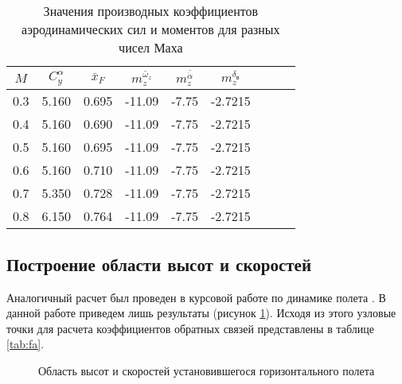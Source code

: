 \begin{table}[H]
\centering
\caption{Значения производных коэффициентов аэродинамических сил и моментов для разных чисел Маха}
\label{tab:aero_coeff}
\begin{tabular}{|c|c|c|c|c|c|c|c|c|}
\hline
$M$ & $C_y^\alpha$ & $\bar{x}_{F}$ & $m_z^{\bar{\omega}_z}$ & $m_{z}^{\bar{\dot{\alpha}}}$ & $m_z^{\delta_в}$ \\
\hline
0.3 &        5.160 &         0.695 &                 -11.09 &                        -7.75 &          -2.7215 \\
0.4 &        5.160 &         0.690 &                 -11.09 &                        -7.75 &          -2.7215 \\
0.5 &        5.160 &         0.695 &                 -11.09 &                        -7.75 &          -2.7215 \\
0.6 &        5.160 &         0.710 &                 -11.09 &                        -7.75 &          -2.7215 \\
0.7 &        5.350 &         0.728 &                 -11.09 &                        -7.75 &          -2.7215 \\
0.8 &        6.150 &         0.764 &                 -11.09 &                        -7.75 &          -2.7215 \\
\hline
\end{tabular}
\end{table}

\subsection{Построение области высот и скоростей}
Аналогичный расчет был проведен в курсовой работе по динамике полета
\cite[c.45]{my_cw}. В данной работе приведем лишь результаты (рисунок
\ref{fig:flight_area}). Исходя из этого узловые точки для расчета коэффициентов
обратных связей представлены в таблице \ref{tab:fa}.

\begin{figure}[H]

\caption{Область высот и скоростей установившегося горизонтального полета}
\label{fig:flight_area}
\end{figure}

